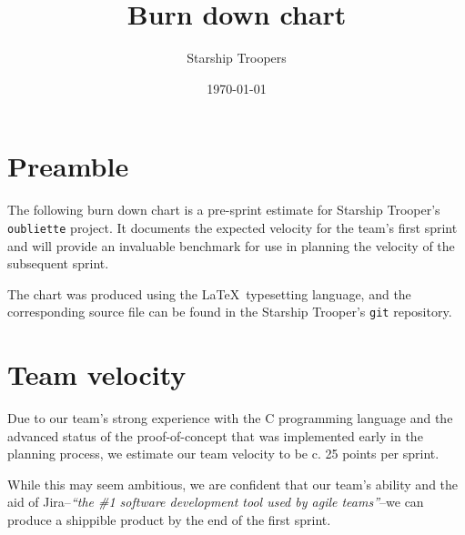 \documentclass[a4paper,12pt,landscape]{article}
\title{Burn down chart}
\author{Starship Troopers}
\date{\today}
\begin{document}
\maketitle

\section*{Preamble}
The following burn down chart is a pre-sprint estimate for Starship
Trooper's \texttt{oubliette} project. It documents the expected
velocity for the team's first sprint and will provide an invaluable
benchmark for use in planning the velocity of the subsequent sprint.

The chart was produced using the \LaTeX\ typesetting language, and
the corresponding source file can be found in the Starship Trooper's
\texttt{git} repository.

\section*{Team velocity}
Due to our team's strong experience with the C programming language
and the advanced status of the proof-of-concept that was implemented
early in the planning process, we estimate our team velocity to be
c. 25 points per sprint.

While this may seem ambitious, we are confident that our team's ability
and the aid of Jira\textregistered--\textit{``the \#1 software development
tool used by agile teams''}--we can produce a shippible product by the
end of the first sprint.

\end{document}
